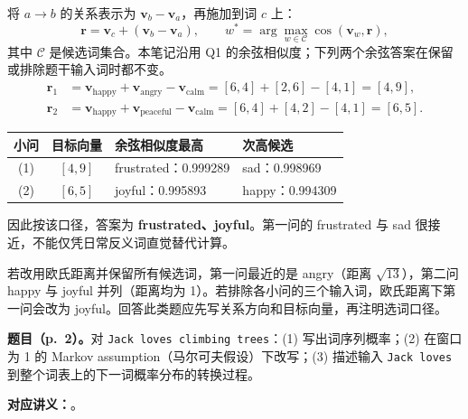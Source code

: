 将 $a\rightarrow b$ 的关系表示为 $\mathbf v_b-\mathbf v_a$，再施加到词 $c$ 上：
\[
 \mathbf r=\mathbf v_c+(\mathbf v_b-\mathbf v_a),\qquad
 w^*=\arg\max_{w\in\mathcal C}\cos(\mathbf v_w,\mathbf r),
\]
其中 $\mathcal C$ 是候选词集合。本笔记沿用 Q1 的余弦相似度；下列两个余弦答案在保留或排除题干输入词时都不变。
\begin{align*}
 \mathbf r_1&=\mathbf v_{\text{happy}}+\mathbf v_{\text{angry}}-\mathbf v_{\text{calm}}
 =[6,4]+[2,6]-[4,1]=\boxed{[4,9]},\\
 \mathbf r_2&=\mathbf v_{\text{happy}}+\mathbf v_{\text{peaceful}}-\mathbf v_{\text{calm}}
 =[6,4]+[4,2]-[4,1]=\boxed{[6,5]}.
\end{align*}
\begin{center}
\begin{tabular}{@{}c c l l@{}}
\toprule
小问 & 目标向量 & 余弦相似度最高 & 次高候选 \\
\midrule
(1) & $[4,9]$ & frustrated：0.999289 & sad：0.998969 \\
(2) & $[6,5]$ & joyful：0.995893 & happy：0.994309 \\
\bottomrule
\end{tabular}
\end{center}
因此按该口径，答案为 \textbf{frustrated、joyful}。第一问的 frustrated 与 sad 很接近，不能仅凭日常反义词直觉替代计算。

若改用欧氏距离并保留所有候选词，第一问最近的是 angry（距离 $\sqrt{13}$），第二问 happy 与 joyful 并列（距离均为 1）。若排除各小问的三个输入词，欧氏距离下第一问会改为 joyful。回答此类题应先写关系方向和目标向量，再注明选词口径。

\nopagebreak[4]

\textbf{题目（p.~2）。}对 \texttt{Jack loves climbing trees}：(1) 写出词序列概率；(2) 在窗口为 1 的 Markov assumption（马尔可夫假设）下改写；(3) 描述输入 \texttt{Jack loves} 到整个词表上的下一词概率分布的转换过程。

\textbf{对应讲义：}。

